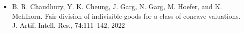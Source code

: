 \begin{itemize}
%
%
%
%

	\item
	B. R. Chaudhury, Y. K. Cheung, J. Garg, N. Garg, M. Hoefer, and K. Mehlhorn. Fair division
	of indivisible goods for a class of concave valuations. J. Artif. Intell. Res., 74:111–142, 2022
\end{itemize}